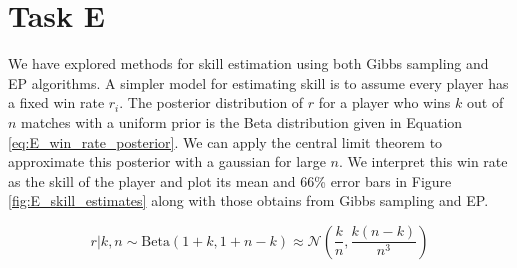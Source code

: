 \documentclass[11pt]{article}
\begin{document}
\section{Task E}

We have explored methods for skill estimation using both Gibbs sampling and EP algorithms. A simpler model for estimating skill is to assume every player has a fixed win rate $r_i$. The posterior distribution of $r$ for a player who wins $k$ out of $n$ matches with a uniform prior is the Beta distribution given in Equation \ref{eq:E_win_rate_posterior}. We can apply the central limit theorem to approximate this posterior with a gaussian for large $n$. We interpret this win rate as the skill of the player and plot its mean and 66\% error bars in Figure \ref{fig:E_skill_estimates} along with those obtains from Gibbs sampling and EP.

\begin{equation}
    r|k,n \sim \text{Beta}(1+k, 1+n-k) \approx \mathcal{N}(\frac{k}{n}, \frac{k(n-k)}{n^3})
    \label{eq:E_win_rate_posterior}
\end{equation}
\end{document}
